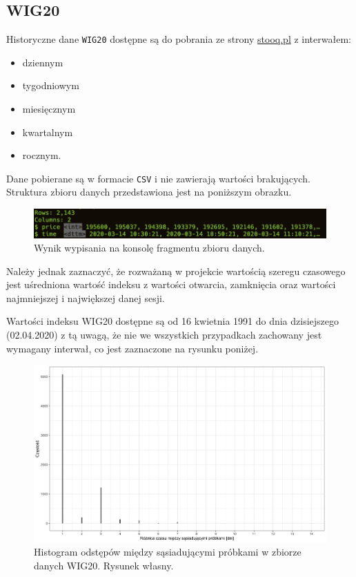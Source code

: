 \documentclass{article}
\begin{document}
\subsection{WIG20}

Historyczne dane \texttt{WIG20} dostępne są do pobrania ze strony
\href{https://stooq.pl/q/d/?s=wig20}{stooq.pl} z interwałem:

\begin{itemize}
\item
  dziennym
\item
  tygodniowym
\item
  miesięcznym
\item
  kwartalnym
\item
  rocznym.
\end{itemize}

Dane pobierane są w formacie \texttt{CSV} i nie zawierają wartości
brakujących. Struktura zbioru danych przedstawiona jest na poniższym
obrazku.

\begin{figure}[H]
  \centering
  \includegraphics[width=.75\textwidth]{./images/wt-glimpse.png}
  \caption{Wynik wypisania na konsolę fragmentu zbioru danych.}
\end{figure}

Należy jednak zaznaczyć, że rozważaną w projekcie wartością szeregu
czasowego jest uśredniona wartość indeksu z wartości otwarcia,
zamknięcia oraz wartości najmniejszej i największej danej sesji.

Wartości indeksu WIG20 dostępne są od 16 kwietnia 1991 do dnia
dzisiejszego (02.04.2020) z tą uwagą, że nie we wszystkich przypadkach
zachowany jest wymagany interwał, co jest zaznaczone na rysunku poniżej.

\begin{figure}[H]
  \centering
  \includegraphics[width=.75\textwidth]{./images/tdiff.png}
  \caption{Histogram odstępów między sąsiadującymi próbkami w zbiorze danych WIG20. Rysunek własny.}
\end{figure}
\end{document}
